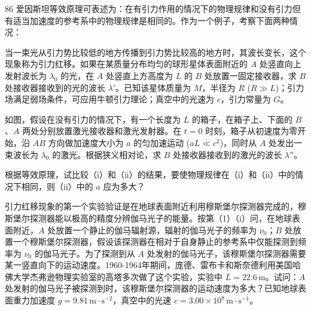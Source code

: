 \begin{problem}[第34届物理决赛][引力红移与等效原理]{86}
    爱因斯坦等效原理可表述为：在有引力作用的情况下的物理规律和没有引力但有适当加速度的参考系中的物理规律是相同的。作为一个例子，考察下面两种情况：
    \begin{subproblem}
        \begin{subsubproblem}
            \begin{subsubsubproblem}
                \begin{subsubsubsubproblem}
                    当一束光从引力势比较低的地方传播到引力势比较高的地方时，其波长变长，这个现象称为引力红移。如果在某质量分布均匀的球形星体表面附近的 $A$ 处竖直向上发射波长为 $\lambda_{0}$ 的光，在 $A$ 处竖直上方高度为 $L$ 的 $B$ 处放置一固定接收器，求 $B$ 处接收器接收到的光的波长 $\lambda'$。已知该星体质量为 $M$，半径为 $R$ ($R\gg L$)；引力场满足弱场条件，可应用牛顿引力理论；真空中的光速为 $c$，引力常量为 $G$。
                \end{subsubsubsubproblem}
                \begin{subsubsubsubproblem}
                    如图，假设在没有引力的情况下，有一个长度为 $L$ 的箱子，在箱子上、下面的 $B$、$A$ 两处分别放置激光接收器和激光发射器。在 $t=0$ 时刻，箱子从初速度为零开始，沿 $AB$ 方向做加速度大小为 $a$ 的匀加速运动 ($aL\ll c^{2}$)，同时从 $A$ 处发出一束波长为 $\lambda_{0}$ 的激光。根据狭义相对论，求 $B$ 处接收器接收到的激光的波长 $\lambda''$。
                \end{subsubsubsubproblem}
                \begin{subsubsubsubproblem}
                    根据等效原理，试比较（i）和（ii）的结果，要使物理规律在（i）和（ii）中的情况下相同，则（ii）中的 $a$ 应为多大？
                \end{subsubsubsubproblem}
            \end{subsubsubproblem}
        \end{subsubproblem}
        \begin{subsubproblem}
            引力红移现象的第一个实验验证是在地球表面附近利用穆斯堡尔探测器完成的，穆斯堡尔探测器能以极高的精度分辨伽马光子的能量。按第（1）（i）问，在地球表面附近，$A$ 处放置一个静止的伽马辐射源，辐射的伽马光子的频率为 $\nu_{0}$；$B$ 处放置一个穆斯堡尔探测器，假设该探测器在相对于自身静止的参考系中仅能探测到频率为 $\nu_{0}$ 的伽马光子。为了探测到从 $A$ 处发射的伽马光子，该穆斯堡尔探测器需要某一竖直向下的运动速度。1960-1964年期间，庞德、雷布卡和斯奈德利用美国哈佛大学杰弗逊物理实验室的高塔多次做了这个实验，实验中 $L=22.6\,\mathrm{m}$。试问：$A$ 处发射的伽马光子被探测到时，该穆斯堡尔探测器的运动速度为多大？已知地球表面重力加速度 $g=9.81\,\mathrm{m\cdot s^{-2}}$，真空中的光速 $c=3.00\times10^{8}\,\mathrm{m\cdot s^{-1}}$。
        \end{subsubproblem}
    \end{subproblem}
\end{problem}